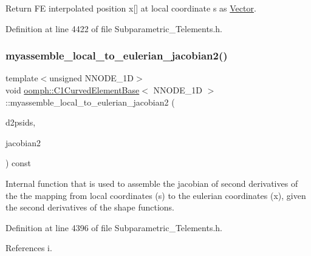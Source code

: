 Return FE interpolated position x\mbox{[}\mbox{]} at local coordinate s as \hyperlink{classoomph_1_1Vector}{Vector}. 



Definition at line 4422 of file Subparametric\+\_\+\+Telements.\+h.

\mbox{\label{classoomph_1_1C1CurvedElementBase_a5c56b56c6c246769b0b5fd3f20253ffe}} 
\subsubsection{\texorpdfstring{myassemble\+\_\+local\+\_\+to\+\_\+eulerian\+\_\+jacobian2()}{myassemble\_local\_to\_eulerian\_jacobian2()}}
{\footnotesize\ttfamily template$<$unsigned N\+N\+O\+D\+E\+\_\+1D$>$ \\
void \hyperlink{classoomph_1_1C1CurvedElementBase}{oomph\+::\+C1\+Curved\+Element\+Base}$<$ N\+N\+O\+D\+E\+\_\+1D $>$\+::myassemble\+\_\+local\+\_\+to\+\_\+eulerian\+\_\+jacobian2 (\begin{DoxyParamCaption}\item[{const \hyperlink{classoomph_1_1DShape}{D\+Shape} \&}]{d2psids,  }\item[{\hyperlink{classoomph_1_1DenseMatrix}{Dense\+Matrix}$<$ double $>$ \&}]{jacobian2 }\end{DoxyParamCaption}) const\hspace{0.3cm}{\ttfamily [inline]}}

Internal function that is used to assemble the jacobian of second derivatives of the the mapping from local coordinates (s) to the eulerian coordinates (x), given the second derivatives of the shape functions. 

Definition at line 4396 of file Subparametric\+\_\+\+Telements.\+h.



References i.

\mbox{\label{classoomph_1_1C1CurvedElementBase_a297ab604e37d625a8d78f9411326650b}} 
